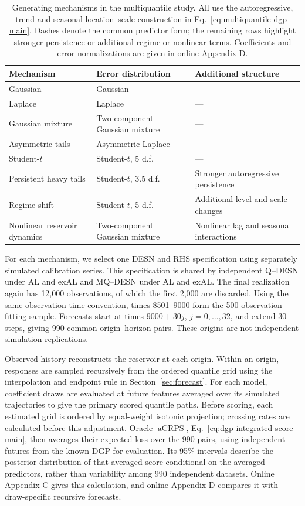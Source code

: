 \documentclass[12pt,letterpaper]{article}
\numberwithin{equation}{section}
\newcommand{\aCRPS}{\operatorname{aCRPS}}
\begin{document}
\begin{table}[!htbp]
\centering
\small
\caption{Generating mechanisms in the multiquantile study. All use the
autoregressive, trend and seasonal location--scale construction in
Eq.~\eqref{eq:multiquantile-dgp-main}. Dashes denote the common predictor
form; the remaining rows highlight stronger persistence or additional
regime or nonlinear terms. Coefficients and error normalizations are given
in online Appendix D.}
\label{tab:multiquantile-generating-mechanisms}
\begin{tabularx}{\textwidth}{@{}
>{\raggedright\arraybackslash}p{}
>{\raggedright\arraybackslash}p{}Y@{}}
\toprule
Mechanism & Error distribution & Additional structure \\
\midrule
Gaussian & Gaussian & --- \\
Laplace & Laplace & --- \\
Gaussian mixture & Two-component Gaussian mixture & --- \\
Asymmetric tails & Asymmetric Laplace & --- \\
Student-\(t\) & Student-\(t\), 5 d.f. & --- \\
Persistent heavy tails & Student-\(t\), 3.5 d.f.
  & Stronger autoregressive persistence \\
Regime shift & Student-\(t\), 5 d.f.
  & Additional level and scale changes \\
Nonlinear reservoir dynamics & Two-component Gaussian mixture
  & Nonlinear lag and seasonal interactions \\
\bottomrule
\end{tabularx}
\end{table}

For each mechanism, we select one DESN and RHS specification using separately
simulated calibration series. This specification is shared by independent
Q--DESN under AL and exAL and MQ--DESN under AL and exAL. The final
realization again has 12,000
observations, of which the first 2,000 are discarded. Using the same
observation-time convention, times 8501--9000 form the 500-observation fitting
sample. Forecasts start at times \(9000+30j\), \(j=0,\ldots,32\), and extend 30 steps,
giving 990 common origin--horizon pairs. These origins are not independent
simulation replications.

Observed history reconstructs the reservoir at each origin. Within an origin,
responses are sampled recursively from the ordered quantile grid using the
interpolation and endpoint rule in Section~\ref{sec:forecast}. For each
model, coefficient draws are evaluated at future features averaged over its
simulated trajectories to give the primary scored quantile paths. Before
scoring, each estimated grid is ordered by equal-weight isotonic projection;
crossing rates are calculated before this adjustment. Oracle \(\aCRPS\),
Eq.~\eqref{eq:dgp-integrated-score-main},
then averages their expected loss over the 990 pairs, using independent
futures from the known DGP for evaluation. Its 95\% intervals describe the
posterior distribution of that averaged score conditional on the averaged
predictors, rather than variability among 990 independent datasets.
Online Appendix C gives this calculation, and online Appendix D compares
it with draw-specific recursive forecasts.
\end{document}
